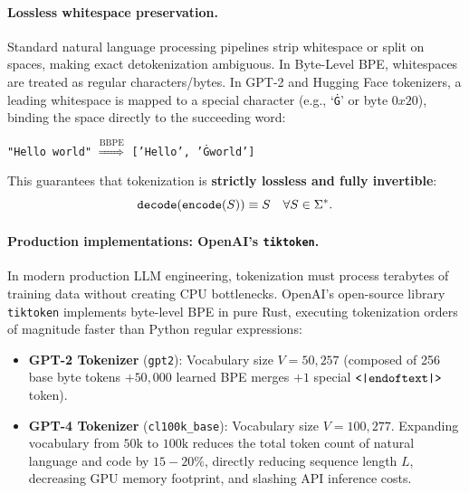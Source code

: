 \documentclass[../../main.tex]{subfiles}
\begin{document}
\paragraph{Lossless whitespace preservation.}
Standard natural language processing pipelines strip whitespace or split on spaces, making exact detokenization ambiguous. In Byte-Level BPE, whitespaces are treated as regular characters/bytes. In GPT-2 and Hugging Face tokenizers, a leading whitespace is mapped to a special character (e.g., `\texttt{Ġ}' or byte $0x20$), binding the space directly to the succeeding word:
\begin{center}
\texttt{"Hello world"} $\stackrel{\text{BBPE}}{\Longrightarrow}$ \texttt{['Hello', 'Ġworld']}
\end{center}
This guarantees that tokenization is \textbf{strictly lossless and fully invertible}:
\begin{equation}
\label{eq:lossless_invertibility}
\text{\texttt{decode}}(\text{\texttt{encode}}(S)) \equiv S \quad \forall S \in \Sigma^*.
\end{equation}

\paragraph{Production implementations: OpenAI's \texttt{tiktoken}.}
In modern production LLM engineering, tokenization must process terabytes of training data without creating CPU bottlenecks. OpenAI's open-source library \texttt{tiktoken} implements byte-level BPE in pure Rust, executing tokenization orders of magnitude faster than Python regular expressions:
\begin{itemize}
    \item \textbf{GPT-2 Tokenizer} (\texttt{gpt2}): Vocabulary size $V = 50{,}257$ (composed of 256 base byte tokens $+ 50{,}000$ learned BPE merges $+ 1$ special $\text{\texttt{<|endoftext|>}}$ token).
    \item \textbf{GPT-4 Tokenizer} (\texttt{cl100k\_base}): Vocabulary size $V = 100{,}277$. Expanding vocabulary from $50\text{k}$ to $100\text{k}$ reduces the total token count of natural language and code by $15-20\%$, directly reducing sequence length $L$, decreasing GPU memory footprint, and slashing API inference costs.
\end{itemize}
\end{document}
